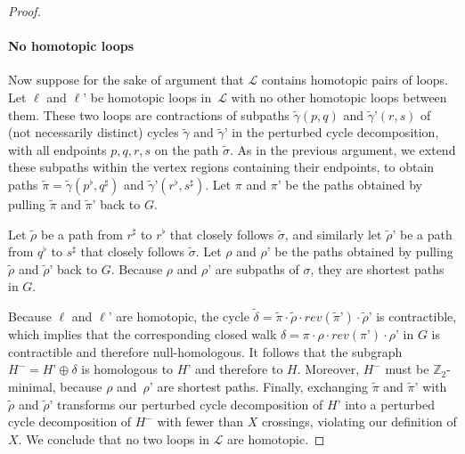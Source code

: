 \documentclass[letterpaper,review]{siamart190516}
\def\Z{\mathbb{Z}}
\def\reverse#1{\textit{rev}(#1)}
\def\jnote#1{\textcolor{orange}{Jeff: #1}}
\begin{document}
\begin{proof}
%
\medskip
\paragraph{\textbf{No homotopic loops}}
%
Now suppose for the sake of argument that $\mathcal{L}$ contains homotopic pairs of loops.  Let $\ell$ and $\ell’$ be homotopic loops in~$\mathcal{L}$ with no other homotopic loops between them.
These two loops are contractions of subpaths $\tilde\gamma(p, q)$ and $\tilde\gamma’(r,s)$ of (not necessarily distinct) cycles $\tilde\gamma$ and $\tilde\gamma’$ in the perturbed cycle decomposition, with all endpoints $p,q,r,s$ on the path $\tilde\sigma$.
%
As in the previous argument, we extend these subpaths within the vertex regions containing their endpoints, to obtain paths $\tilde\pi = \tilde\gamma(p^\flat, q^\sharp)$ and $\tilde\gamma’(r^\flat, s^\sharp)$.  Let $\pi$ and $\pi’$ be the paths obtained by pulling $\tilde\pi$ and $\tilde\pi’$ back to $G$.

Let $\tilde\rho$ be a path from $r^\sharp$ to $r^\flat$ that closely follows $\tilde\sigma$, and similarly let $\tilde\rho’$ be a path from $q^\flat$ to $s^\sharp$ that closely follows $\tilde\sigma$.  Let $\rho$ and $\rho’$ be the paths obtained by pulling $\tilde\rho$ and $\tilde\rho’$ back to $G$.  Because $\rho$ and $\rho’$ are subpaths of $\sigma$, they are shortest paths in $G$.

Because $\ell$ and $\ell’$ are homotopic, the cycle $\tilde\delta = \tilde\pi \cdot \tilde\rho \cdot \reverse{\tilde\pi’} \cdot \tilde\rho’$ is contractible, which implies that the corresponding closed walk $\delta = \pi\cdot\rho\cdot\reverse{\pi’}\cdot\rho’$ in $G$ is contractible and therefore null-homologous.  It follows that the subgraph $H^- = H’\oplus \delta$ is homologous to $H’$ and therefore to $H$.  Moreover, $H^-$ must be $\Z_2$-minimal, because $\rho$ and~$\rho’$ are shortest paths.
%
Finally, exchanging $\tilde\pi$ and $\tilde\pi’$ with $\tilde\rho$ and $\tilde\rho’$ transforms our perturbed cycle decomposition of $H’$ into a perturbed cycle decomposition of $H^-$ with fewer than $X$ crossings, violating our definition of $X$.  We conclude that no two loops in $\mathcal{L}$ are homotopic.
\end{proof}

\end{document}
